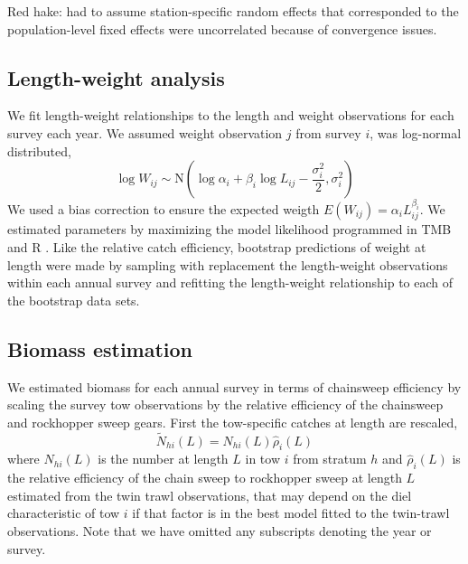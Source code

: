 \documentclass[]{article}
\begin{document}
Red hake: had to assume station-specific random effects that
corresponded to the population-level fixed effects were uncorrelated
because of convergence issues.

\hypertarget{length-weight-analysis}{%
\subsection{Length-weight analysis}\label{length-weight-analysis}}

We fit length-weight relationships to the length and weight observations
for each survey each year. We assumed weight observation \(j\) from
survey \(i\), was log-normal distributed, \begin{equation}\label{wal}
 \log W_{ij} \sim \text{N}\left(\log \alpha_i + \beta_i \log L_{ij} - \frac{\sigma_i^2}{2}, \sigma_i^2\right)
\end{equation} We used a bias correction to ensure the expected weigth
\(E(W_{ij})= \alpha_i L_{ij}^{\beta_i}\). We estimated parameters by
maximizing the model likelihood programmed in TMB
\citep{kristensenetal16} and R \citep{R19}. Like the relative catch
efficiency, bootstrap predictions of weight at length were made by
sampling with replacement the length-weight observations within each
annual survey and refitting the length-weight relationship to each of
the bootstrap data sets.

\hypertarget{biomass-estimation}{%
\subsection{Biomass estimation}\label{biomass-estimation}}

We estimated biomass for each annual survey in terms of chainsweep
efficiency by scaling the survey tow observations by the relative
efficiency of the chainsweep and rockhopper sweep gears. First the
tow-specific catches at length are rescaled, \begin{equation}\label{nal}
\widetilde N_{hi}\left(L\right) = N_{hi}\left(L\right)\widehat \rho_i\left(L\right)
\end{equation} where \(N_{hi}(L)\) is the number at length \(L\) in tow
\(i\) from stratum \(h\) and \(\widehat \rho_i\left(L\right)\) is the
relative efficiency of the chain sweep to rockhopper sweep at length
\(L\) estimated from the twin trawl observations, that may depend on the
diel characteristic of tow \(i\) if that factor is in the best model
fitted to the twin-trawl observations. Note that we have omitted any
subscripts denoting the year or survey.
\end{document}
